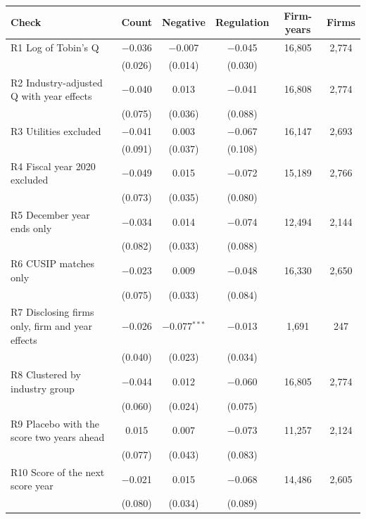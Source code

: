 \begin{tabular}{lccccc}
\toprule
Check & Count & Negative & Regulation & Firm-years & Firms \\
\midrule
R1 Log of Tobin's Q & $-$0.036 & $-$0.007 & $-$0.045 & 16,805 & 2,774 \\
 & (0.026) & (0.014) & (0.030) & & \\
R2 Industry-adjusted Q with year effects & $-$0.040 & 0.013 & $-$0.041 & 16,808 & 2,774 \\
 & (0.075) & (0.036) & (0.088) & & \\
R3 Utilities excluded & $-$0.041 & 0.003 & $-$0.067 & 16,147 & 2,693 \\
 & (0.091) & (0.037) & (0.108) & & \\
R4 Fiscal year 2020 excluded & $-$0.049 & 0.015 & $-$0.072 & 15,189 & 2,766 \\
 & (0.073) & (0.035) & (0.080) & & \\
R5 December year ends only & $-$0.034 & 0.014 & $-$0.074 & 12,494 & 2,144 \\
 & (0.082) & (0.033) & (0.088) & & \\
R6 CUSIP matches only & $-$0.023 & 0.009 & $-$0.048 & 16,330 & 2,650 \\
 & (0.075) & (0.033) & (0.084) & & \\
R7 Disclosing firms only, firm and year effects & $-$0.026 & $-$0.077$^{***}$ & $-$0.013 & 1,691 & 247 \\
 & (0.040) & (0.023) & (0.034) & & \\
R8 Clustered by industry group & $-$0.044 & 0.012 & $-$0.060 & 16,805 & 2,774 \\
 & (0.060) & (0.024) & (0.075) & & \\
R9 Placebo with the score two years ahead & 0.015 & 0.007 & $-$0.073 & 11,257 & 2,124 \\
 & (0.077) & (0.043) & (0.083) & & \\
R10 Score of the next score year & $-$0.021 & 0.015 & $-$0.068 & 14,486 & 2,605 \\
 & (0.080) & (0.034) & (0.089) & & \\
\bottomrule
\end{tabular}
